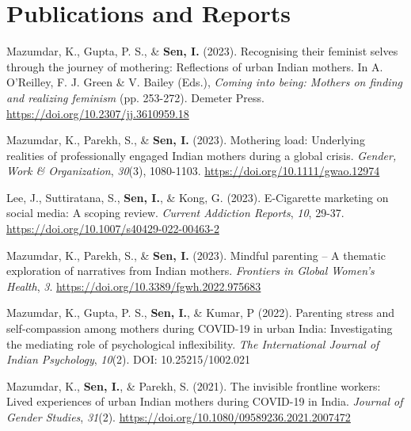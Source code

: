 \documentclass[a4paper,11pt]{article}
\begin{document}
\section{\textbf{Publications and Reports}}
\vspace{0.2mm}
\small{
  \begin{enumerate}[leftmargin=*, labelsep=0.5em, align=left, widest={[\textbf{S.1}]}, itemindent=0em, label={\textbf{[\arabic*]}}]
    \item Mazumdar, K., Gupta, P. S., \& \textbf{Sen, I.} (2023). Recognising their feminist selves through the journey of mothering: Reflections of urban Indian mothers. In A. O’Reilley,
          F. J. Green \& V. Bailey (Eds.), \textit{Coming into being: Mothers on finding and realizing feminism} (pp. 253-272). Demeter Press. \href{https://doi.org/10.2307/jj.3610959.18}{https://doi.org/10.2307/jj.3610959.18}

    \item Mazumdar, K., Parekh, S., \& \textbf{Sen, I.} (2023). Mothering load: Underlying realities of professionally engaged Indian mothers during a global crisis. \textit{Gender, Work \&
            Organization}, \textit{30}(3), 1080-1103. \href{https://doi.org/10.1111/gwao.12974}{https://doi.org/10.1111/gwao.12974}

    \item Lee, J., Suttiratana, S., \textbf{Sen, I.}, \& Kong, G. (2023). E-Cigarette marketing on social media: A scoping review. \textit{Current Addiction Reports}, \textit{10}, 29-37.
          \href{https://doi.org/10.1007/s40429-022-00463-2}{https://doi.org/10.1007/s40429-022-00463-2}

    \item Mazumdar, K., Parekh, S., \& \textbf{Sen, I.} (2023). Mindful parenting – A thematic exploration of narratives from Indian mothers. \textit{Frontiers in Global Women's Health}, \textit{3}.
          \href{https://doi.org/10.3389/fgwh.2022.975683}{https://doi.org/10.3389/fgwh.2022.975683}

    \item Mazumdar, K., Gupta, P. S., \textbf{Sen, I.}, \& Kumar, P (2022). Parenting stress and self-compassion among mothers during COVID-19 in urban India: Investigating the
          mediating role of psychological inflexibility. \textit{The International Journal of Indian Psychology}, \textit{10}(2). DOI: 10.25215/1002.021

    \item Mazumdar, K., \textbf{Sen, I.}, \& Parekh, S. (2021). The invisible frontline workers: Lived experiences of urban Indian mothers during COVID-19 in India. \textit{Journal of Gender
            Studies}, \textit{31}(2). \href{https://doi.org/10.1080/09589236.2021.2007472}{https://doi.org/10.1080/09589236.2021.2007472}


\end{enumerate}}
\end{document}

